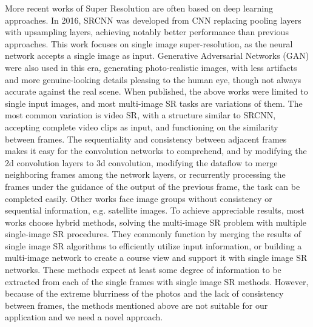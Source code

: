 More recent works of Super Resolution are often based on deep learning approaches. In 2016, SRCNN \cite{dong2015image} was developed from CNN replacing pooling layers with upsampling layers, achieving notably better performance than previous approaches. This work focuses on single image super-resolution, as the neural network accepts a single image as input. Generative Adversarial Networks (GAN) were also used in this era\cite{ledig2017photo}, generating photo-realistic images, with less artifacts and more genuine-looking details pleasing to the human eye, though not always accurate against the real scene. When published, the above works were limited to single input images, and most multi-image SR tasks are variations of them. The most common variation is video SR\cite{shi2016real, kappeler2016video}, with a structure similar to SRCNN, accepting complete video clips as input, and functioning on the similarity between frames. The sequentiality and consistency between adjacent frames makes it easy for the convolution networks to comprehend, and by modifying the 2d convolution layers to 3d convolution\cite{caballero2017real}, modifying the dataflow to merge neighboring frames among the network layers\cite{huang2017video}, or recurrently processing the frames under the guidance of the output of the previous frame\cite{sajjadi2018frame}, the task can be completed easily. Other works face image groups without consistency or sequential information, e.g. satellite images. To achieve appreciable results, most works choose hybrid methods, solving the multi-image SR problem with multiple single-image SR procedures. They commonly function by merging the results of single image SR algorithms to efficiently utilize input information\cite{kawulok2019deep}, or building a multi-image network to create a course view and support it with single image SR networks\cite{8834937}. These methods expect at least some degree of information to be extracted from each of the single frames with single image SR methods. However, because of the extreme blurriness of the photos and the lack of consistency between frames, the methods mentioned above are not suitable for our application and we need a novel approach.